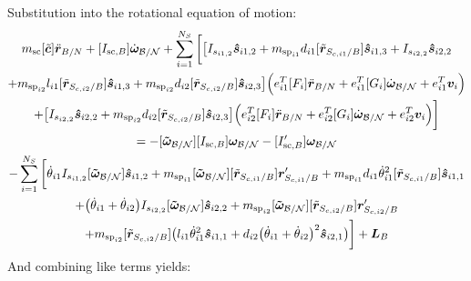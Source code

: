 \documentclass[paper]{aiaaNew}
\begin{document}
Substitution into the rotational equation of motion:
	\begin{multline}
m_{\text{sc}} [\tilde{\bm{c}}] \ddot{\bm r}_{B/N} + [I_{\text{sc},B}] \dot{\bm\omega}_{\cal B/N} + \sum\limits_{i=1}^{N_S} \bigg[  \big[I_{s_{i1,2}}\bm{\hat{s}}_{i1,2}+m_{\text{sp}_{i1}}d_{i1} [\tilde{\bm{r}}_{S_{c,i1}/B}]   \bm{\hat{s}}_{i1,3} + I_{s_{i2,2}}\bm{\hat{s}}_{i2,2}\\
+m_{\text{sp}_{i2}}l_{i1} [\tilde{\bm{r}}_{S_{c,i2}/B}]  \bm{\hat{s}}_{i1,3}+m_{\text{sp}_{i2}}d_{i2} [\tilde{\bm{r}}_{S_{c,i2}/B}] \bm{\hat{s}}_{i2,3}\big] \Big(e_{i1}^T[F_i] \ddot{\bm r}_{B/N} + e_{i1}^T[G_i]\dot{\bm\omega}_{\cal B/N} + e_{i1}^T\bm v_i\Big)\\
+\big[ I_{s_{i2,2}}\bm{\hat{s}}_{i2,2}+m_{\text{sp}_{i2}} d_{i2} [\tilde{\bm{r}}_{S_{c,i2}/B}] \bm{\hat{s}}_{i2,3}\big]\Big(e_{i2}^T[F_i] \ddot{\bm r}_{B/N} + e_{i2}^T[G_i]\dot{\bm\omega}_{\cal B/N} + e_{i2}^T\bm v_i\Big)
\bigg] \\
= -[\bm{\tilde{\omega}}_{\cal B/N}] [I_{\text{sc},B}] \bm\omega_{\cal B/N} - [I'_{\text{sc},B}] \bm\omega_{\cal B/N} \\
-  \sum\limits_{i=1}^{N_S} \bigg[
\dot{\theta}_{i1} I_{s_{i1,2}} [\bm{\tilde{\omega}}_{\cal B/N}] \bm{\hat{s}}_{i1,2} 
+m_{\text{sp}_{i1}} [\bm{\tilde{\omega}}_{\cal B/N}] [\tilde{\bm{r}}_{S_{c,i1}/B}] \bm{r}'_{S_{c,i1}/B} +m_{\text{sp}_{i1}}d_{i1}\dot{\theta}_{i1}^2  [\tilde{\bm{r}}_{S_{c,i1}/B}] \bm{\hat{s}}_{i1,1}\\
+ \big(\dot{\theta}_{i1}+\dot{\theta}_{i2}\big) I_{s_{i2,2}}[\bm{\tilde{\omega}}_{\cal B/N}]\bm{\hat{s}}_{i2,2}
+m_{\text{sp}_{i2}} [\bm{\tilde{\omega}}_{\cal B/N}] [\tilde{\bm{r}}_{S_{c,i2}/B}] \bm{r}'_{S_{c,i2}/B} 	\\+m_{\text{sp}_{i2}} [\tilde{\bm{r}}_{S_{c,i2}/B}] \big(l_{i1} \dot{\theta}_{i1}^2 \bm{\hat{s}}_{i1,1} + d_{i2}\big(\dot{\theta}_{i1} + \dot{\theta}_{i2}\big)^2\bm{\hat{s}}_{i2,1}\big)\bigg]
+ \bm{L}_B 
\label{eq:Final7sub}
\end{multline}
And combining like terms yields:
\end{document}
